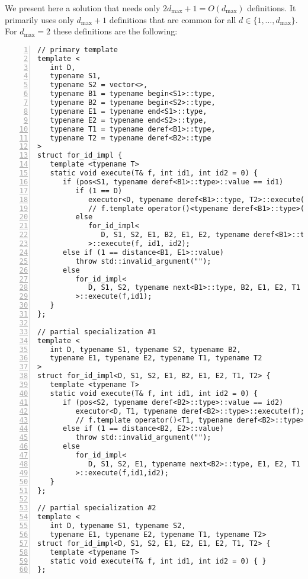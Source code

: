 \documentclass[10pt,a4paper]{article}
\theoremstyle{definition}\newtheorem{problem}{Problem}
\providecommand{\symdim}{\ensuremath{d}\xspace}
\providecommand{\symdimmax}{\ensuremath{d_{\max}}\xspace}
\begin{document}
We present here a solution that needs only $2\symdimmax+1=O(\symdimmax)$ definitions. It primarily uses only $\symdimmax+1$ definitions that are common for all $\symdim\in\{1,\ldots,\symdimmax\}$. For $\symdimmax=2$ these definitions are the following: 
{\small
\begin{lstlisting}[numbers=left,xleftmargin=2em]
// primary template
template <
   int D,
   typename S1,
   typename S2 = vector<>,
   typename B1 = typename begin<S1>::type,
   typename B2 = typename begin<S2>::type,
   typename E1 = typename end<S1>::type,
   typename E2 = typename end<S2>::type,
   typename T1 = typename deref<B1>::type,
   typename T2 = typename deref<B2>::type
>
struct for_id_impl {             
   template <typename T>
   static void execute(T& f, int id1, int id2 = 0) {
      if (pos<S1, typename deref<B1>::type>::value == id1)                               
         if (1 == D)                                                              (* \label{lst:opt:condo} *)
            executor<D, typename deref<B1>::type, T2>::execute(f);
            // f.template operator()<typename deref<B1>::type>();                 (* \label{lst:opt:commo} *)
         else
            for_id_impl<
               D, S1, S2, E1, B2, E1, E2, typename deref<B1>::type
            >::execute(f, id1, id2);
      else if (1 == distance<B1, E1>::value)                                      (* \label{lst:opt:condt} *)
         throw std::invalid_argument("");
      else
         for_id_impl<
            D, S1, S2, typename next<B1>::type, B2, E1, E2, T1
         >::execute(f,id1);
   }
};

// partial specialization #1
template <
   int D, typename S1, typename S2, typename B2,
   typename E1, typename E2, typename T1, typename T2
>
struct for_id_impl<D, S1, S2, E1, B2, E1, E2, T1, T2> {                   
   template <typename T>
   static void execute(T& f, int id1, int id2 = 0) {
      if (pos<S2, typename deref<B2>::type>::value == id2)
         executor<D, T1, typename deref<B2>::type>::execute(f);
         // f.template operator()<T1, typename deref<B2>::type>();                (* \label{lst:opt:commt} *)
      else if (1 == distance<B2, E2>::value)                                      (* \label{lst:opt:condh} *)
         throw std::invalid_argument("");
      else
         for_id_impl<
            D, S1, S2, E1, typename next<B2>::type, E1, E2, T1
         >::execute(f,id1,id2);
   }
};

// partial specialization #2
template <
   int D, typename S1, typename S2,
   typename E1, typename E2, typename T1, typename T2>                        
struct for_id_impl<D, S1, S2, E1, E2, E1, E2, T1, T2> {
   template <typename T>
   static void execute(T& f, int id1, int id2 = 0) { }
};
\end{lstlisting}
}
\end{document}
